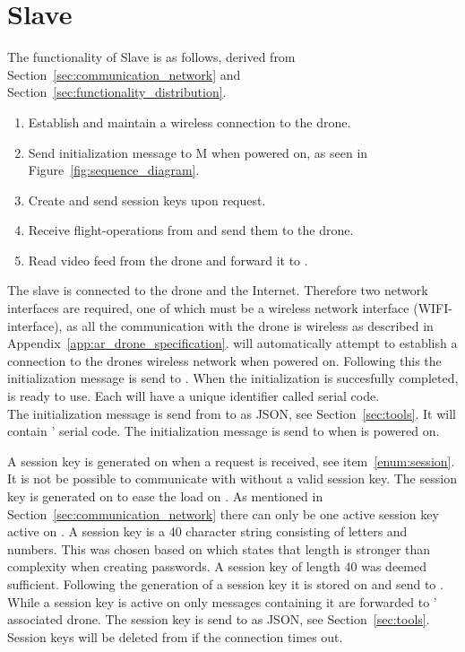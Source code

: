 \section{Slave}
\label{sec:design_slave}
The functionality of Slave is as follows, derived from Section~\ref{sec:communication_network} and Section~\ref{sec:functionality_distribution}.

\begin{enumerate}
	\item Establish and maintain a wireless connection to the drone.\label{enum:wireless}
	\item Send initialization message to M when powered on, as seen in Figure~\ref{fig:sequence_diagram}.\label{enum:initialization}
	\item Create and send session keys upon request.\label{enum:session}
	\item Receive flight-operations from  and send them to the drone.\label{enum:actions}
	\item Read video feed from the drone and forward it to .\label{enum:stream}
\end{enumerate}

The slave is connected to the drone and the Internet.
Therefore two network interfaces are required, one of which must be a wireless network interface (WIFI-interface), as all the communication with the drone is wireless as described in Appendix~\ref{app:ar_drone_specification}.
 will automatically attempt to establish a connection to the drones wireless network when powered on.
Following this the initialization message is send to .
When the initialization is succesfully completed,  is ready to use.
Each  will have a unique identifier called serial code. \\

The initialization message is send from  to  as JSON, see Section~\ref{sec:tools}.
It will contain ' serial code.
The initialization message is send to  when  is powered on.

A session key is generated on  when a request is received, see item~\ref{enum:session}.
It is not be possible to communicate with  without a valid session key.
The session key is generated on  to ease the load on .
As mentioned in Section~\ref{sec:communication_network} there can only be one active session key active on .
A session key is a 40 character string consisting of letters and numbers.
This was chosen based on \citep{password_length} which states that length is stronger than complexity when creating passwords.
A session key of length 40 was deemed sufficient.
Following the generation of a session key it is stored on  and send to .
While a session key is active on  only messages containing it are forwarded to ' associated drone.
The session key is send to  as JSON, see Section~\ref{sec:tools}.
Session keys will be deleted from  if the connection times out.

